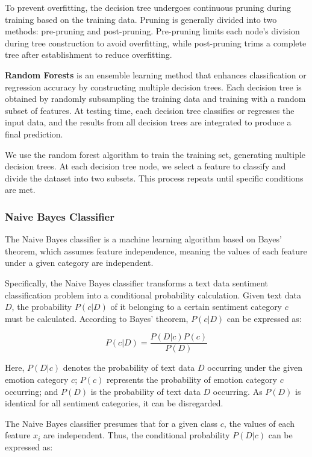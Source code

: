 \documentclass[a4paper]{article}
\begin{document}
To prevent overfitting, the decision tree undergoes continuous pruning during training based on the training data. Pruning is generally divided into two methods: pre-pruning and post-pruning. \cite{ref_dt3}Pre-pruning limits each node's division during tree construction to avoid overfitting, while post-pruning trims a complete tree after establishment to reduce overfitting. 

\textbf{Random Forests} is an ensemble learning method that enhances classification or regression accuracy by constructing multiple decision trees. Each decision tree is obtained by randomly subsampling the training data and training with a random subset of features. At testing time, each decision tree classifies or regresses the input data, and the results from all decision trees are integrated to produce a final prediction.

We use the random forest algorithm to train the training set, generating multiple decision trees. At each decision tree node, we select a feature to classify and divide the dataset into two subsets. This process repeats until specific conditions are met.

\subsubsection{Naive Bayes Classifier}

The Naive Bayes classifier is a machine learning algorithm based on Bayes' theorem, which assumes feature independence, meaning the values of each feature under a given category are independent.

Specifically, the Naive Bayes classifier transforms a text data sentiment classification problem into a conditional probability calculation. Given text data $D$, the probability $P(c|D)$ of it belonging to a certain sentiment category $c$ must be calculated. According to Bayes' theorem, $P(c|D)$ can be expressed as:

$$P(c|D)=\dfrac{P(D|c)P(c)}{P(D)}$$

Here, $P(D|c)$ denotes the probability of text data $D$ occurring under the given emotion category $c$; $P(c)$ represents the probability of emotion category $c$ occurring; and $P(D)$ is the probability of text data $D$ occurring. As $P(D)$ is identical for all sentiment categories, it can be disregarded.\cite{ref_nbc1}

The Naive Bayes classifier presumes that for a given class $c$, the values of each feature $x_i$ are independent. Thus, the conditional probability $P(D|c)$ can be expressed as:
\end{document}
